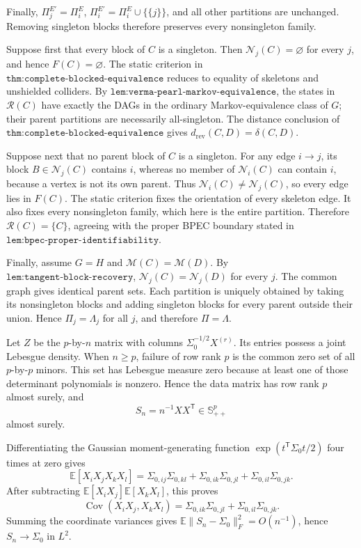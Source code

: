Finally, \(\Pi^{E'}_j=\Pi^E_i\), \(\Pi^{E'}_i=\Pi^E_i\cup\{\{j\}\}\), and all other partitions are unchanged. Removing singleton blocks therefore preserves every nonsingleton family.

Suppose first that every block of \(C\) is a singleton. Then \(\mathcal N_j(C)=\varnothing\) for every \(j\), and hence \(F(C)=\varnothing\). The static criterion in \(\texttt{thm:complete-blocked-equivalence}\) reduces to equality of skeletons and unshielded colliders. By \(\texttt{lem:verma-pearl-markov-equivalence}\), the states in \(\mathcal R(C)\) have exactly the DAGs in the ordinary Markov-equivalence class of \(G\); their parent partitions are necessarily all-singleton. The distance conclusion of \(\texttt{thm:complete-blocked-equivalence}\) gives \(d_{\mathrm{rev}}(C,D)=\delta(C,D)\).

Suppose next that no parent block of \(C\) is a singleton. For any edge \(i\to j\), its block \(B\in\mathcal N_j(C)\) contains \(i\), whereas no member of \(\mathcal N_i(C)\) can contain \(i\), because a vertex is not its own parent. Thus \(\mathcal N_i(C)\neq\mathcal N_j(C)\), so every edge lies in \(F(C)\). The static criterion fixes the orientation of every skeleton edge. It also fixes every nonsingleton family, which here is the entire partition. Therefore \(\mathcal R(C)=\{C\}\), agreeing with the proper BPEC boundary stated in \(\texttt{lem:bpec-proper-identifiability}\).

Finally, assume \(G=H\) and \(\mathcal M(C)=\mathcal M(D)\). By \(\texttt{lem:tangent-block-recovery}\), \(\mathcal N_j(C)=\mathcal N_j(D)\) for every \(j\). The common graph gives identical parent sets. Each partition is uniquely obtained by taking its nonsingleton blocks and adding singleton blocks for every parent outside their union. Hence \(\Pi_j=\Lambda_j\) for all \(j\), and therefore \(\Pi=\Lambda\).

Let \(Z\) be the \(p\)-by-\(n\) matrix with columns \(\Sigma_0^{-1/2}X^{(r)}\). Its entries possess a joint Lebesgue density. When \(n\geq p\), failure of row rank \(p\) is the common zero set of all \(p\)-by-\(p\) minors. This set has Lebesgue measure zero because at least one of those determinant polynomials is nonzero. Hence the data matrix has row rank \(p\) almost surely, and
\[
 S_n=n^{-1}XX^{\mathsf T}\in\mathbb S^p_{++}
\]
almost surely.

Differentiating the Gaussian moment-generating function \(\exp(t^{\mathsf T}\Sigma_0t/2)\) four times at zero gives
\[
 \mathbb E[X_iX_jX_kX_l]
 =\Sigma_{0,ij}\Sigma_{0,kl}
  +\Sigma_{0,ik}\Sigma_{0,jl}
  +\Sigma_{0,il}\Sigma_{0,jk}.
\]
After subtracting \(\mathbb E[X_iX_j]\mathbb E[X_kX_l]\), this proves
\[
 \operatorname{Cov}(X_iX_j,X_kX_l)
 =\Sigma_{0,ik}\Sigma_{0,jl}+\Sigma_{0,il}\Sigma_{0,jk}.
\]
Summing the coordinate variances gives \(\mathbb E\|S_n-\Sigma_0\|_F^2=O(n^{-1})\), hence \(S_n\to\Sigma_0\) in \(L^2\).

